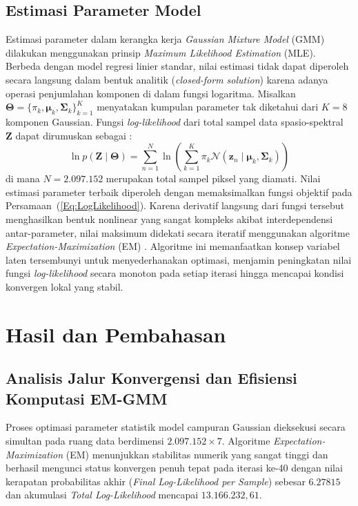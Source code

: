 \documentclass[11pt,twoside]{article}
\begin{document}
\subsection{Estimasi Parameter Model}
\label{SubSec:Estimation}
Estimasi parameter dalam kerangka kerja \textit{Gaussian Mixture Model} (GMM) dilakukan menggunakan prinsip \textit{Maximum Likelihood Estimation} (MLE). Berbeda dengan model regresi linier standar, nilai estimasi tidak dapat diperoleh secara langsung dalam bentuk analitik (\textit{closed-form solution}) karena adanya operasi penjumlahan komponen di dalam fungsi logaritma. Misalkan $\boldsymbol{\Theta} = \{\pi_k, \boldsymbol{\mu}_k, \boldsymbol{\Sigma}_k\}_{k=1}^K$ menyatakan kumpulan parameter tak diketahui dari $K=8$ komponen Gaussian. Fungsi \textit{log-likelihood} dari total sampel data spasio-spektral $\mathbf{Z}$ dapat dirumuskan sebagai \cite{mclachlan2000finite}:
\begin{equation}
    \ln p(\mathbf{Z} \mid \boldsymbol{\Theta}) = \sum_{n=1}^{N} \ln \left( \sum_{k=1}^{K} \pi_k \mathcal{N}(\mathbf{z}_n \mid \boldsymbol{\mu}_k, \boldsymbol{\Sigma}_k) \right)
\label{Eq:LogLikelihood}
\end{equation}
di mana $N = 2.097.152$ merupakan total sampel piksel yang diamati. Nilai estimasi parameter terbaik diperoleh dengan memaksimalkan fungsi objektif pada Persamaan~(\ref{Eq:LogLikelihood}). Karena derivatif langsung dari fungsi tersebut menghasilkan bentuk nonlinear yang sangat kompleks akibat interdependensi antar-parameter, nilai maksimum didekati secara iteratif menggunakan algoritme \textit{Expectation-Maximization} (EM) \cite{bishop2006pattern}. Algoritme ini memanfaatkan konsep variabel laten tersembunyi untuk menyederhanakan optimasi, menjamin peningkatan nilai fungsi \textit{log-likelihood} secara monoton pada setiap iterasi hingga mencapai kondisi konvergen lokal yang stabil.


\section{Hasil dan Pembahasan}
\label{Sec:Results}

\subsection{Analisis Jalur Konvergensi dan Efisiensi Komputasi EM-GMM}
Proses optimasi parameter statistik model campuran Gaussian dieksekusi secara simultan pada ruang data berdimensi $2.097.152 \times 7$. Algoritme \textit{Expectation-Maximization} (EM) menunjukkan stabilitas numerik yang sangat tinggi dan berhasil mengunci status konvergen penuh tepat pada iterasi ke-40 dengan nilai kerapatan probabilitas akhir (\textit{Final Log-Likelihood per Sample}) sebesar $6.27815$ dan akumulasi \textit{Total Log-Likelihood} mencapai $13.166.232,61$.
\end{document}
